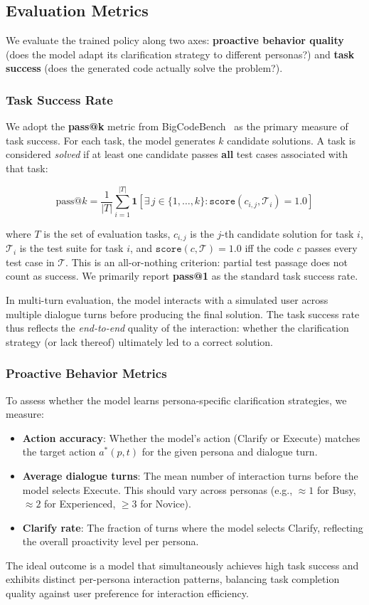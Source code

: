 \subsection{Evaluation Metrics}

We evaluate the trained policy along two axes: \textbf{proactive behavior quality} (does the model adapt its clarification strategy to different personas?) and \textbf{task success} (does the generated code actually solve the problem?).

\subsubsection{Task Success Rate}

We adopt the \textbf{pass@k} metric from BigCodeBench~\cite{zhuo2024bigcodebench} as the primary measure of task success. For each task, the model generates $k$ candidate solutions. A task is considered \emph{solved} if at least one candidate passes \textbf{all} test cases associated with that task:

\begin{equation}
\text{pass@}k = \frac{1}{|T|} \sum_{i=1}^{|T|} \mathbf{1}\!\left[\exists\, j \in \{1,\dots,k\} : \texttt{score}(c_{i,j}, \mathcal{T}_i) = 1.0\right]
\end{equation}

where $T$ is the set of evaluation tasks, $c_{i,j}$ is the $j$-th candidate solution for task $i$, $\mathcal{T}_i$ is the test suite for task $i$, and $\texttt{score}(c, \mathcal{T}) = 1.0$ iff the code $c$ passes every test case in $\mathcal{T}$. This is an all-or-nothing criterion: partial test passage does not count as success. We primarily report \textbf{pass@1} as the standard task success rate.

In multi-turn evaluation, the model interacts with a simulated user across multiple dialogue turns before producing the final solution. The task success rate thus reflects the \emph{end-to-end} quality of the interaction: whether the clarification strategy (or lack thereof) ultimately led to a correct solution.

\subsubsection{Proactive Behavior Metrics}

To assess whether the model learns persona-specific clarification strategies, we measure:

\begin{itemize}
    \item \textbf{Action accuracy}: Whether the model's action (Clarify or Execute) matches the target action $a^*(p, t)$ for the given persona and dialogue turn.
    \item \textbf{Average dialogue turns}: The mean number of interaction turns before the model selects Execute. This should vary across personas (e.g., $\approx 1$ for Busy, $\approx 2$ for Experienced, $\geq 3$ for Novice).
    \item \textbf{Clarify rate}: The fraction of turns where the model selects Clarify, reflecting the overall proactivity level per persona.
\end{itemize}

The ideal outcome is a model that simultaneously achieves high task success and exhibits distinct per-persona interaction patterns, balancing task completion quality against user preference for interaction efficiency.
